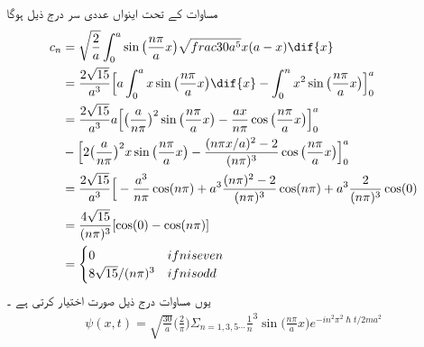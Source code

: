 مساوات   کے تحت اینواں عددی سر درج ذیل ہوگا
\begin{align*}
c_{n}&=\sqrt{\frac{2}{a}}\int_{0}^{a}\sin\big(\frac{n\pi}{a}x\big)\sqrt{frac{30}{a^{5}}}x(a-x)\dif{x}\\
&=\frac{2\sqrt{15}}{a^{3}}\Big[a\int_{0}^{a}x\sin\big(\frac{n\pi}{a}x\big)\dif{x}-\int_{0}^{n}x^{2}\sin\big(\frac{n\pi}{a}x\big)\Big]_{0}^{a}\\
&=\frac{2\sqrt{15}}{a^{3}}a\Big[\big(\frac{a}{n\pi}\big)^{2}\sin\big(\frac{n\pi}{a}x\big)-\frac{ax}{n\pi}\cos\big(\frac{n\pi}{a}x\big)\Big]_{0}^{a}\\
&-\Big[2\big(\frac{a}{n\pi}\big)^{2}x\sin\big(\frac{n\pi}{a}x\big)-\frac{(n\pi x/a)^{2}-2}{(n\pi)^{3}}\cos\big(\frac{n\pi}{a}x\big)\Big]_{0}^{a}\\
&=\frac{2\sqrt{15}}{a^{3}}\Big[-\frac{a^{3}}{n\pi}\cos(n\pi)+a^{3}\frac{(n\pi)^{2}-2}{(n\pi)^{3}}\cos(n\pi)+a^{3}\frac{2}{(n\pi)^{3}}\cos(0)\\
&=\frac{4\sqrt{15}}{(n\pi)^{3}}[\cos(0)-\cos(n\pi)]\\
&=\begin{cases}
0 & if n is even\\
8\sqrt{15}/(n\pi)^{3}&if n is odd
\end{cases}
\end{align*}
یوں مساوات  درج ذیل صورت اختیار کرتی ہے ۔
 \begin{align*}
\psi(x,t)=\sqrt{\frac{30}{a}}\big(\frac{2}{\pi}\big)\Sigma_{n=1,3,5\cdots}\frac{1}{n}^{3}\sin\big(\frac{n\pi}{a}x\big)e^{-in^{2}\pi^{2}\hslash t/2ma^{2}}
\end{align*}



























 










